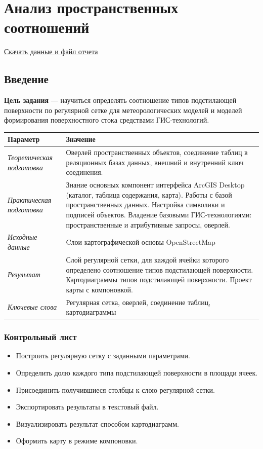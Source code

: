 \documentclass[12pt,]{book}
\providecommand{\tightlist}{%
  \setlength{\itemsep}{0pt}\setlength{\parskip}{0pt}}
\begin{document}
\hypertarget{land-cover-hydro}{%
\chapter{Анализ пространственных соотношений}\label{land-cover-hydro}}

\href{http://autolab.geogr.msu.ru/gis/data/Ex11.zip}{Скачать данные и файл отчета}

\hypertarget{land-cover-hydro-intro}{%
\section{Введение}\label{land-cover-hydro-intro}}

\textbf{Цель задания} --- научиться определять соотношение типов подстилающей поверхности по регулярной сетке для метеорологических моделей и моделей формирования поверхностного стока средствами ГИС-технологий.

\begin{longtable}[]{@{}ll@{}}
\toprule
Параметр & Значение\tabularnewline
\midrule
\endhead
\emph{Теоретическая подготовка} & Оверлей пространственных объектов, соединение таблиц в реляционных базах данных, внешний и внутренний ключ соединения.\tabularnewline
\emph{Практическая подготовка} & Знание основных компонент интерфейса ArcGIS Desktop (каталог, таблица содержания, карта). Работы с базой пространственных данных. Настройка символики и подписей объектов. Владение базовыми ГИС-технологиями: пространственные и атрибутивные запросы, оверлей.\tabularnewline
\emph{Исходные данные} & Cлои картографической основы OpenStreetMap\tabularnewline
\emph{Результат} & Слой регулярной сетки, для каждой ячейки которого определено соотношение типов подстилающей поверхности. Картодиаграммы типов подстилающей поверхности. Проект карты с компоновкой.\tabularnewline
\emph{Ключевые слова} & Регулярная сетка, оверлей, соединение таблиц, картодиаграммы\tabularnewline
\bottomrule
\end{longtable}

\hypertarget{land-cover-hydro-control}{%
\subsection{Контрольный лист}\label{land-cover-hydro-control}}

\begin{itemize}
\tightlist
\item
  Построить регулярную сетку с заданными параметрами.
\item
  Определить долю каждого типа подстилающей поверхности в площади ячеек.
\item
  Присоединить получившиеся столбцы к слою регулярной сетки.
\item
  Экспортировать результаты в текстовый файл.
\item
  Визуализировать результат способом картодиаграмм.
\item
  Оформить карту в режиме компоновки.
\end{itemize}
\end{document}
